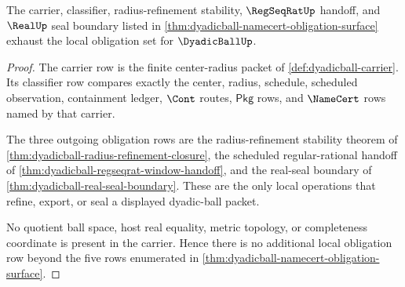\begin{theorem}
\label{thm:dyadicball-obligation-closure}
The carrier, classifier, radius-refinement stability, $\RegSeqRatUp$ handoff,
and $\RealUp$ seal boundary listed in
\autoref{thm:dyadicball-namecert-obligation-surface} exhaust the local
obligation set for $\DyadicBallUp$.
\end{theorem}
\begin{proof}
The carrier row is the finite center-radius packet of
\autoref{def:dyadicball-carrier}. Its classifier row compares exactly the
center, radius, schedule, scheduled observation, containment ledger,
$\Cont$ routes, $\mathsf{Pkg}$ rows, and $\NameCert$ rows named by that
carrier.

The three outgoing obligation rows are the radius-refinement stability theorem
of \autoref{thm:dyadicball-radius-refinement-closure}, the scheduled
regular-rational handoff of
\autoref{thm:dyadicball-regseqrat-window-handoff}, and the real-seal boundary
of \autoref{thm:dyadicball-real-seal-boundary}. These are the only local
operations that refine, export, or seal a displayed dyadic-ball packet.

No quotient ball space, host real equality, metric topology, or completeness
coordinate is present in the carrier. Hence there is no additional local
obligation row beyond the five rows enumerated in
\autoref{thm:dyadicball-namecert-obligation-surface}.
\end{proof}


